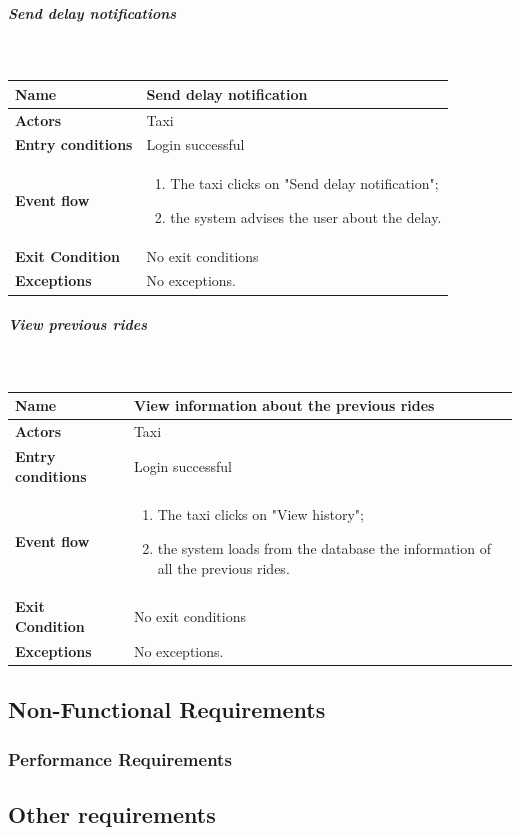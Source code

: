 \newpage
\subparagraph{Send delay notifications}
~\\[0.2cm]
\vspace{20pt}
\noindent
\begin{tabular}{l l}
 \textbf {Name} & Send delay notification  \\ \hline
 \textbf{Actors} & Taxi \\ \hline
 \textbf{Entry conditions} & Login successful \\ \hline
 \textbf{Event flow} & 
 \parbox{0.7\textwidth}{
 \begin{enumerate}
 \item The taxi clicks on "Send delay notification";
 \item the system advises the user about the delay.
 \end{enumerate}
 } \\ \hline
 \textbf{Exit Condition} & No exit conditions \\ \hline
 \textbf{Exceptions} & No exceptions.
\end{tabular}

\subparagraph{View previous rides}
~\\[0.2cm]
\vspace{20pt}
\noindent
\begin{tabular}{l l}
 \textbf {Name} & View information about the previous rides  \\ \hline
 \textbf{Actors} & Taxi \\ \hline
 \textbf{Entry conditions} & Login successful \\ \hline
 \textbf{Event flow} & 
 \parbox{0.7\textwidth}{
 \begin{enumerate}
 \item The taxi clicks on "View history";
 \item the system loads from the database the information of all the previous rides.
 \end{enumerate}
 } \\ \hline
 \textbf{Exit Condition} & No exit conditions \\ \hline
 \textbf{Exceptions} & No exceptions.
\end{tabular}

	\subsection{Non-Functional Requirements}
		\subsubsection{Performance Requirements}
	\subsection{Other requirements}
	
